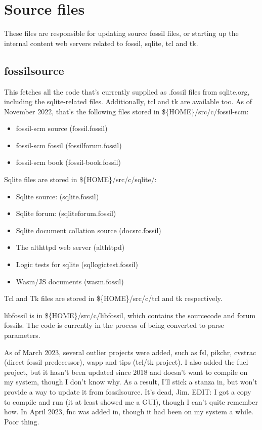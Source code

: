 \documentclass[11pt]{article}
\begin{document}
\setcounter{tocdepth}{2}
\tableofcontents

\newpage

\section*{Source files}
\label{sec:org556cb84}
These files are responsible for updating source fossil files, or starting up the internal
content web servers related to fossil, sqlite, tcl and tk.

\subsection*{fossilsource}
\label{sec:orgbc04e40}
This fetches all the code that's currently supplied as .fossil files from sqlite.org, including
the sqlite-related files. Additionally, tcl and tk are available too.
As of November 2022, that's the following files stored in \$\{HOME\}/src/c/fossil-scm:
\begin{itemize}
\item fossil-scm source (fossil.fossil)
\item fossil-scm fossil (fossilforum.fossil)
\item fossil-scm book (fossil-book.fossil)
\end{itemize}

Sqlite files are stored in \$\{HOME\}/src/c/sqlite/:
\begin{itemize}
\item Sqlite source: (sqlite.fossil)
\item Sqlite forum: (sqliteforum.fossil)
\item Sqlite document collation source (docsrc.fossil)
\item The althttpd web server (althttpd)
\item Logic tests for sqlite (sqllogictest.fossil)
\item Wasm/JS documents (wasm.fossil)
\end{itemize}

Tcl and Tk files are stored in \$\{HOME\}/src/c/tcl and tk respectively.

libfossil is in \$\{HOME\}/src/c/libfossil, which contains the sourcecode and forum fossils.
The code is currently in the process of being converted to parse parameters.

As of March 2023, several outlier projects were added, such as fsl, pikchr, cvstrac (direct fossil
predecessor), wapp and tips (tcl/tk project). I also added the fuel project, but it hasn't been
updated since 2018 and doesn't want to compile on my system, though I don't know why. As a
result, I'll stick a stanza in, but won't provide a way to update it from fossilsource. It's dead, Jim.
EDIT: I got a copy to compile and run (it at least showed me a GUI), though I can't quite remember how.
In April 2023, fnc was added in, though it had been on my system a while. Poor thing.
\end{document}
